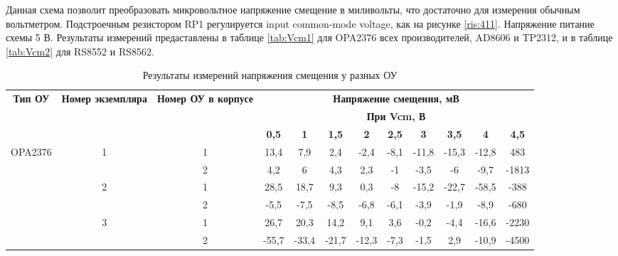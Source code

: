 Данная схема позволит преобразовать микровольтное напряжение смещение в миливольты, что достаточно для 
измерения обычным вольтметром. Подстроечным резистором RP1 регулируется input common-mode voltage, как 
на рисунке \ref{ris:411}. Напряжение питание схемы 5 В. Результаты измерений предаставлены в таблице
\ref{tab:Vcm1} для OPA2376 всех производителей, AD8606 и TP2312, и в таблице \ref{tab:Vcm2} для RS8552 и 
RS8562.

\begin{table}[H]
    \begin{adjustwidth}{-1em}{}
    \centering
    \caption{Результаты измерений напряжения смещения у разных ОУ}
      \begin{tabular}{|c|c|c|c|c|c|c|c|c|c|c|c|}
      \hline
      \multicolumn{1}{|c|}{\multirow{3}[6]{2cm}{\textbf{Тип ОУ}}} & \multicolumn{1}{c|}{\multirow{3}[6]{1.4cm}{\textbf{Номер экземпляра}}} & \multicolumn{1}{c|}{\multirow{3}[6]{1.8cm}{\textbf{Номер ОУ в корпусе}}} & \multicolumn{9}{|c|}{\textbf{Напряжение смещения, мВ}} \bigstrut\\
  \cline{4-12}          &       &       & \multicolumn{9}{|c|}{\textbf{При Vcm, В}} \bigstrut\\
  \cline{4-12}          &       &       & \textbf{0,5} & \textbf{1} & \textbf{1,5} & \textbf{2} & \textbf{2,5} & \textbf{3} & \textbf{3,5} & \textbf{4} & \textbf{4,5} \bigstrut\\
      \hline
      \multicolumn{1}{|c|}{\multirow{10}[20]{*}{OPA2376 }} & \multirow{2}[4]{*}{1} & 1     & 13,4  & 7,9   & 2,4   & -2,4  & -8,1  & -11,8 & -15,3 & -12,8 & 483 \bigstrut\\
  \cline{3-12}          &       & 2     & 4,2   & 6     & 4,3   & 2,3   & -1    & -3,5  & -6    & -9,7  & -1813 \bigstrut\\
  \cline{2-12}          & \multirow{2}[4]{*}{2} & 1     & 28,5  & 18,7  & 9,3   & 0,3   & -8    & -15,2 & -22,7 & -58,5 & -388 \bigstrut\\
  \cline{3-12}          &       & 2     & -5,5  & -7,5  & -8,5  & -6,8  & -6,1  & -3,9  & -1,9  & -8,9  & -680 \bigstrut\\
  \cline{2-12}          & \multirow{2}[4]{*}{3} & 1     & 26,7  & 20,3  & 14,2  & 9,1   & 3,6   & -0,2  & -4,4  & -16,6 & -2230 \bigstrut\\
  \cline{3-12}          &       & 2     & -55,7 & -33,4 & -21,7 & -12,3 & -7,3  & -1,5  & 2,9   & -10,9 & -4500 \bigstrut\\

\end{tabular}
\end{adjustwidth}
\end{table}
